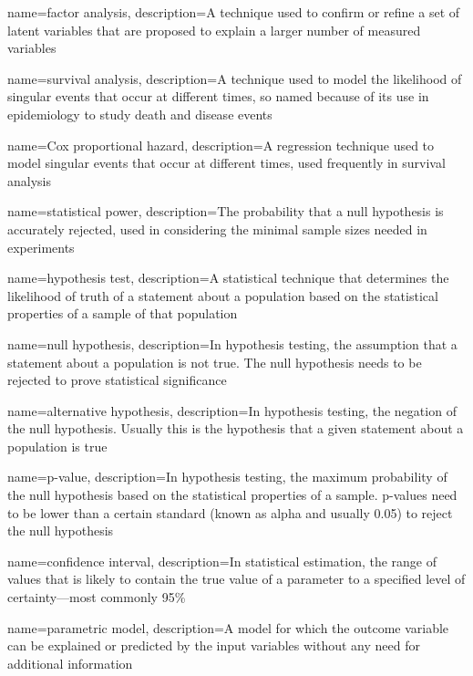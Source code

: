 {
    name={factor analysis},
    description={A technique used to confirm or refine a set of latent variables that are proposed to explain a larger number of measured variables}
}

{
    name={survival analysis},
    description={A technique used to model the likelihood of singular events that occur at different times, so named because of its use in epidemiology to study death and disease events}
}

{
    name={Cox proportional hazard},
    description={A regression technique used to model singular events that occur at different times, used frequently in survival analysis}
}

{
    name={statistical power},
    description={The probability that a null hypothesis is accurately rejected, used in considering the minimal sample sizes needed in experiments}
}

{
    name={hypothesis test},
    description={A statistical technique that determines the likelihood of truth of a statement about a population based on the statistical properties of a sample of that population}
}

{
    name={null hypothesis},
    description={In hypothesis testing, the assumption that a statement about a population is not true.  The null hypothesis needs to be rejected to prove statistical significance}
}

{
    name={alternative hypothesis},
    description={In hypothesis testing, the negation of the null hypothesis.  Usually this is the hypothesis that a given statement about a population is true}
}

{
    name={p-value},
    description={In hypothesis testing, the maximum probability of the null hypothesis based on the statistical properties of a sample. p-values need to be lower than a certain standard (known as alpha and usually 0.05) to reject the null hypothesis}
}

{
    name={confidence interval},
    description={In statistical estimation, the range of values that is likely to contain the true value of a parameter to a specified level of certainty---most commonly 95\%}
}

{
    name={parametric model},
    description={A model for which the outcome variable can be explained or predicted by the input variables without any need for additional information}
}

